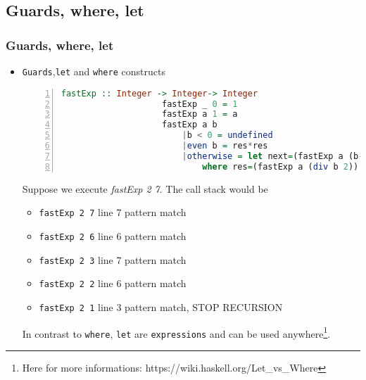	\subsection{Guards, where, let}
	\begin{frame}[fragile]\frametitle{Guards, where, let}
		\begin{itemize}
			\item \texttt{Guards},\texttt{let} and \texttt{where} constructs
			\begin{lstlisting}[language=Haskell,basicstyle=\footnotesize\ttfamily,numbers=left]
			fastExp :: Integer -> Integer-> Integer
					fastExp _ 0 = 1
					fastExp a 1 = a
					fastExp a b 
					 	|b < 0 = undefined
					 	|even b = res*res
					 	|otherwise = let next=(fastExp a (b-1)) in (a * next)  
						  	where res=(fastExp a (div b 2))
			\end{lstlisting}
			Suppose we execute \emph{fastExp 2 7}. The call stack would be
			\begin{itemize}
			  \item  \texttt{fastExp 2 7} line 7 pattern match
			  \pause
			  \item  \texttt{fastExp 2 6} line 6 pattern match
			  \pause
			  \item  \texttt{fastExp 2 3} line 7 pattern match
			 \pause
			  \item  \texttt{fastExp 2 2} line 6 pattern match
			 \pause
			  \item  \texttt{fastExp 2 1} line 3 pattern match, STOP RECURSION
			 \end{itemize}
			 \pause
			 In contrast to \texttt{where}, \texttt{let} are \texttt{expressions} and can
			 be used anywhere\footnote{Here for more informations:
			 https://wiki.haskell.org/Let\_vs\_Where}.

	
		\end{itemize}
	\end{frame}
	
	
